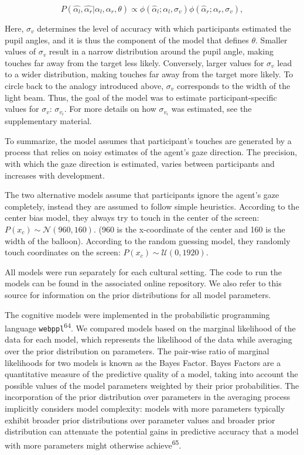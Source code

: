 \documentclass[
  man,floatsintext]{apa6}
\begin{document}
\begin{equation}
P(\hat{\alpha_l}, \hat{\alpha_r} | \alpha_l, \alpha_r, \theta) \propto \phi(\hat{\alpha}_l ; \alpha_l, \sigma_v)\phi(\hat{\alpha}_r ; \alpha_r, \sigma_v),
\end{equation}

Here, \(\sigma_v\) determines the level of accuracy with which participants estimated the pupil angles, and it is thus the component of the model that defines \(\theta\). Smaller values of \(\sigma_v\) result in a narrow distribution around the pupil angle, making touches far away from the target less likely. Conversely, larger values for \(\sigma_v\) lead to a wider distribution, making touches far away from the target more likely. To circle back to the analogy introduced above, \(\sigma_v\) corresponds to the width of the light beam. Thus, the goal of the model was to estimate participant-specific values for \(\sigma_v\): \(\sigma_{v_i}\). For more details on how \(\sigma_{v_i}\) was estimated, see the supplementary material.

To summarize, the model assumes that participant's touches are generated by a process that relies on noisy estimates of the agent's gaze direction. The precision, with which the gaze direction is estimated, varies between participants and increases with development.

The two alternative models assume that participants ignore the agent's gaze completely, instead they are assumed to follow simple heuristics. According to the center bias model, they always try to touch in the center of the screen: \(P(x_c) \sim \mathcal{N}(960, 160)\). (960 is the x-coordinate of the center and 160 is the width of the balloon). According to the random guessing model, they randomly touch coordinates on the screen: \(P(x_c) \sim \mathcal{U}(0, 1920)\).

All models were run separately for each cultural setting. The code to run the models can be found in the associated online repository. We also refer to this source for information on the prior distributions for all model parameters.

The cognitive models were implemented in the probabilistic programming language \texttt{webppl}\textsuperscript{64}. We compared models based on the marginal likelihood of the data for each model, which represents the likelihood of the data while averaging over the prior distribution on parameters. The pair-wise ratio of marginal likelihoods for two models is known as the Bayes Factor. Bayes Factors are a quantitative measure of the predictive quality of a model, taking into account the possible values of the model parameters weighted by their prior probabilities. The incorporation of the prior distribution over parameters in the averaging process implicitly considers model complexity: models with more parameters typically exhibit broader prior distributions over parameter values and broader prior distribution can attenuate the potential gains in predictive accuracy that a model with more parameters might otherwise achieve\textsuperscript{65}.
\end{document}
